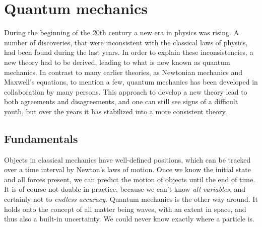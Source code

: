 \chapter{Quantum mechanics}
During the beginning of the 20th century a new era in physics was rising.
A number of discoveries, that were inconsistent with the classical laws of physics, had been found during the last years.
In order to explain these inconsistencies, a new theory had to be derived, leading to what is now known as quantum mechanics.
In contrast to many earlier theories, as Newtonian mechanics and Maxwell's equations, to mention a few, quantum mechanics has been developed in collaboration by many persons.
This approach to develop a new theory lead to both agreements and disagreements, and one can still see signs of a difficult youth, but over the years it has stabilized into a more consistent theory.



\section{Fundamentals}
Objects in classical mechanics have well-defined positions, which can
be tracked over a time interval by Newton's laws of motion.
Once we know the initial state and all forces present, we can predict the
motion of objects until the end of time. 
It is of course not doable in practice, because we can't know \textit{all
variables}, and certainly not to \textit{endless accuracy}.
Quantum mechanics is the other way around.
It holds onto the concept of all matter being waves, with an extent in space,
and thus also a built-in uncertainty.
We could never know exactly where a particle is.

